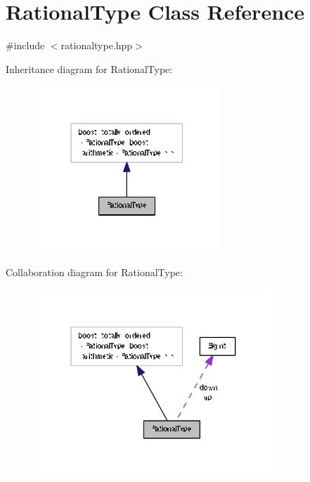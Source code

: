 \hypertarget{class_rational_type}{}\section{Rational\+Type Class Reference}
\label{class_rational_type}


{\ttfamily \#include $<$rationaltype.\+hpp$>$}



Inheritance diagram for Rational\+Type\+:
\nopagebreak
\begin{figure}[H]
\begin{center}
\leavevmode
\includegraphics[width=199pt]{class_rational_type__inherit__graph}
\end{center}
\end{figure}


Collaboration diagram for Rational\+Type\+:
\nopagebreak
\begin{figure}[H]
\begin{center}
\leavevmode
\includegraphics[width=256pt]{class_rational_type__coll__graph}
\end{center}
\end{figure}
